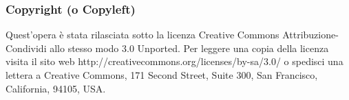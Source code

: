 \documentclass{beamer}
\begin{document}
\begin{frame}\frametitle{Copyright (o Copyleft)}
Quest'opera è stata rilasciata sotto la licenza Creative Commons
Attribuzione-Condividi allo stesso modo 3.0 Unported. Per leggere una
copia della licenza visita il sito web
http://creativecommons.org/licenses/by-sa/3.0/ o spedisci una lettera
a Creative Commons, 171 Second Street, Suite 300, San Francisco,
California, 94105, USA.
\end{frame}
\end{document}
